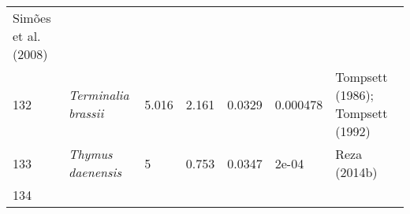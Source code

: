 \documentclass[]{article}
\begin{document}
\begin{longtable}[]{@{}lllllll@{}}
\begin{minipage}[t]{0.23\columnwidth}
Simões et al. (2008)\strut
\end{minipage}\tabularnewline
\begin{minipage}[t]{0.05\columnwidth}\raggedright
132\strut
\end{minipage} & \begin{minipage}[t]{0.23\columnwidth}\raggedright
\emph{Terminalia brassii}\strut
\end{minipage} & \begin{minipage}[t]{0.05\columnwidth}\raggedright
5.016\strut
\end{minipage} & \begin{minipage}[t]{0.08\columnwidth}\raggedright
2.161\strut
\end{minipage} & \begin{minipage}[t]{0.08\columnwidth}\raggedright
0.0329\strut
\end{minipage} & \begin{minipage}[t]{0.08\columnwidth}\raggedright
0.000478\strut
\end{minipage} & \begin{minipage}[t]{0.23\columnwidth}\raggedright
Tompsett (1986); Tompsett (1992)\strut
\end{minipage}\tabularnewline
\begin{minipage}[t]{0.05\columnwidth}\raggedright
133\strut
\end{minipage} & \begin{minipage}[t]{0.23\columnwidth}\raggedright
\emph{Thymus daenensis}\strut
\end{minipage} & \begin{minipage}[t]{0.05\columnwidth}\raggedright
5\strut
\end{minipage} & \begin{minipage}[t]{0.08\columnwidth}\raggedright
0.753\strut
\end{minipage} & \begin{minipage}[t]{0.08\columnwidth}\raggedright
0.0347\strut
\end{minipage} & \begin{minipage}[t]{0.08\columnwidth}\raggedright
2e-04\strut
\end{minipage} & \begin{minipage}[t]{0.23\columnwidth}\raggedright
Reza (2014b)\strut
\end{minipage}\tabularnewline
\begin{minipage}[t]{0.05\columnwidth}\raggedright
134\strut
\end{minipage} & \begin{minipage}[t]{0.23\columnwidth}\raggedright

\end{minipage}
\end{longtable}
\end{document}
